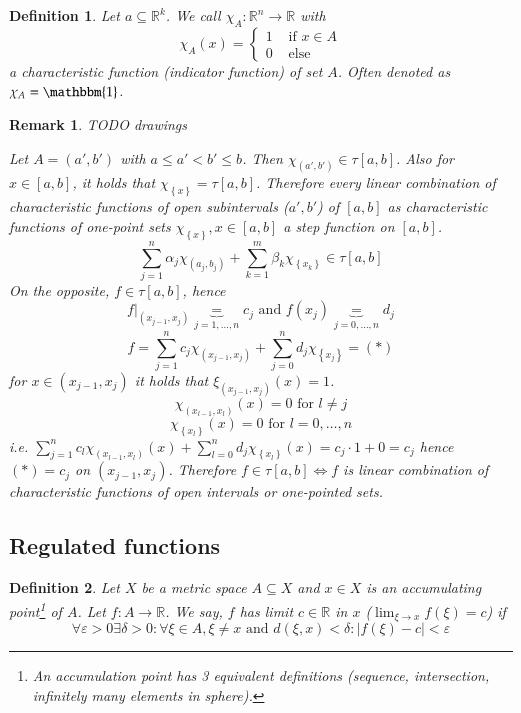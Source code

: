 \documentclass{article}
\newtheorem{definition}{Definition}  \numberwithin{definition}{section}
\newtheorem{remark}{Remark}  \numberwithin{remark}{section}
\newcommand{\set}[1]{\left\{#1\right\}}
\newcommand{\card}[1]{\left|#1\right|}
\begin{document}
\begin{definition} %
  Let $a \subseteq \mathbb R^k$. We call $\chi_A: \mathbb R^n \to \mathbb R$ with
  \[
    \chi_A(x) = \begin{cases}
      1 & \text{ if } x \in A \\
      0 & \text{ else}
    \end{cases}
  \]
  a \emph{characteristic function} (indicator function) of set $A$.
  Often denoted as $\chi_A = \mathbbm{1}$.
\end{definition}

\begin{remark}
  TODO drawings

  Let $A = (a', b')$ with $a \leq a' < b' \leq b$.
  Then $\chi_{(a',b')} \in \tau[a,b]$. Also for $x \in [a,b]$, it holds that $\chi_{\set{x}} = \tau[a,b]$.
  Therefore every linear combination of characteristic functions of open subintervals ($a',b'$) of $[a,b]$
  as characteristic functions of one-point sets $\chi_{\set{x}}, x \in [a,b]$ a step function on $[a,b]$.
  \[ \sum_{j=1}^n \alpha_j \chi_{(a_j,b_j)} + \sum_{k=1}^m \beta_k \chi_{\set{x_k}} \in \tau[a,b] \]
  On the opposite, $f \in \tau[a,b]$, hence
  \[ f|_{(x_{j-1},x_j)} \underbrace{=}_{j=1,\dots,n} c_j \text{ and } f(x_j) \underbrace{=}_{j=0,\dots,n} d_j \]
  \[ f = \sum_{j=1}^n c_j \chi_{(x_{j-1},x_j)} + \sum_{j=0}^n d_j \chi_{\set{x_j}} = (*) \]
  for $x \in (x_{j-1}, x_j)$ it holds that $\xi_{(x_{j-1},x_j)}(x) = 1$.
  \[ \chi_{(x_{l-1},x_l)}(x) = 0 \text{ for } l \neq j \]
  \[ \chi_{\set{x_l}}(x) = 0 \text{ for } l = 0, \dots, n \]
  i.e. $\sum_{j=1}^n c_l \chi_{(x_{l-1},x_l)}(x) + \sum_{l=0}^n d_j \chi_{\set{x_l}}(x) = c_j \cdot 1 + 0 = c_j$
  hence $(*) = c_j$ on $(x_{j-1}, x_j)$. Therefore $f \in \tau[a,b] \iff f$ is linear combination of characteristic functions
  of open intervals or one-pointed sets.
\end{remark}

\subsection{Regulated functions}

\begin{definition} %
  Let $X$ be a metric space $A \subseteq X$ and $x \in X$ is an accumulating point\footnote{An accumulation point has 3 equivalent definitions (sequence, intersection, infinitely many elements in sphere).} of $A$.
  Let $f: A \to \mathbb R$. We say, $f$ has limit $c \in \mathbb R$ in $x$ ($\lim_{\xi\to x} f(\xi) = c$) if
  \[
    \forall \varepsilon > 0 \exists \delta > 0: \forall \xi \in A, \xi \neq x \text{ and } d(\xi, x) < \delta:
    \card{f(\xi) - c} < \varepsilon
  \]
\end{definition}
\end{document}
